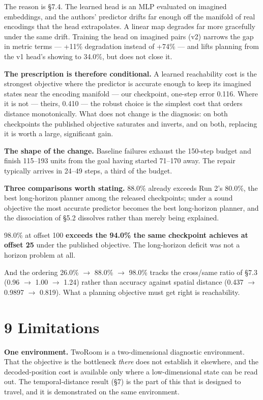 \documentclass[10pt]{article}
\begin{document}
The reason is \S{}7.4. The learned head is an MLP evaluated on imagined
embeddings, and the authors' predictor drifts far enough off the manifold of
real encodings that the head extrapolates. A linear map degrades far more
gracefully under the same drift. Training the head on imagined pairs (v2)
narrows the gap in metric terms --- +11\% degradation instead of +74\% --- and
lifts planning from the v1 head's showing to 34.0\%, but does not close it.

\textbf{The prescription is therefore conditional.} A learned reachability cost is
the strongest objective where the predictor is accurate enough to keep its
imagined states near the encoding manifold --- our checkpoint, one-step error
0.116. Where it is not --- theirs, 0.410 --- the robust choice is the simplest
cost that orders distance monotonically. What does not change is the
diagnosis: on both checkpoints the published objective saturates and inverts,
and on both, replacing it is worth a large, significant gain.

\textbf{The shape of the change.} Baseline failures exhaust the 150-step budget and
finish 115--193 units from the goal having started 71--170 away. The repair
typically arrives in 24--49 steps, a third of the budget.

\textbf{Three comparisons worth stating.} 88.0\% already exceeds Run 2's 80.0\%, the
best long-horizon planner among the released checkpoints; under a sound
objective the most accurate predictor becomes the best long-horizon planner,
and the dissociation of \S{}5.2 dissolves rather than merely being explained.

98.0\% at offset 100 \textbf{exceeds the 94.0\% the same checkpoint achieves at offset
25} under the published objective. The long-horizon deficit was not a horizon
problem at all.

And the ordering 26.0\% $\rightarrow$ 88.0\% $\rightarrow$ 98.0\% tracks the cross/same ratio of \S{}7.3
(0.96 $\rightarrow$ 1.00 $\rightarrow$ 1.24) rather than accuracy against spatial distance
(0.437 $\rightarrow$ 0.9897 $\rightarrow$ 0.819). What a planning objective must get right is
reachability.

\section{9 Limitations}\label{limitations}

\textbf{One environment.} TwoRoom is a two-dimensional diagnostic environment. That
the objective is the bottleneck \emph{there} does not establish it elsewhere, and
the decoded-position cost is available only where a low-dimensional state can
be read out. The temporal-distance result (\S{}7) is the part of this that is
designed to travel, and it is demonstrated on the same environment.
\end{document}
